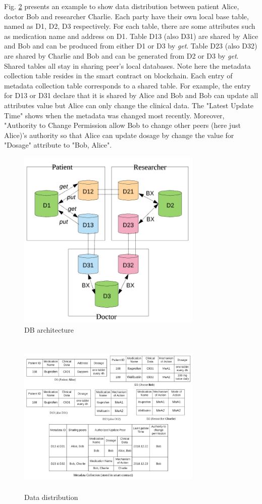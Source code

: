 \documentclass[conference]{IEEEtran}
\begin{document}
Fig. \ref{dataRepresentation} presents an example to show data distribution between patient Alice, doctor Bob and researcher Charlie. Each party have their own local base table, named as D1, D2, D3 respectively. For each table, there are some attributes such as medication name and address on D1. Table D13 (also D31) are shared by Alice and Bob and can be produced from either D1 or D3 by \emph{get}. Table D23 (also D32) are shared by Charlie and Bob and can be generated from D2 or D3 by \emph{get}.  Shared tables all stay in sharing peer's local databases. Note here the metadata collection table resides in the smart contract on blockchain. Each entry of metadata collection table corresponds to a shared table. For example, the entry for D13 or D31 declare that it is shared by Alice and Bob and Bob can update all attributes value but Alice can only change the clinical data. The "Latest Update Time" shows when the metadata was changed most recently. Moreover, "Authority to Change Permission allow Bob to change other peers (here just Alice)'s authority so that Alice can update dosage by change the value for "Dosage" attribute to "Bob, Alice".

\begin{figure}[htbp]
	\centerline{\includegraphics[width=250pt]{DBStructure.png}}
	\caption{DB architecture}
	\label{DB architecture}
\end{figure}

\begin{figure}[htbp]
	\centerline{\includegraphics[width=250pt,height=220pt]{medicalData.png}}
	\caption{Data distribution}
	\label{dataRepresentation}
\end{figure}
\end{document}
